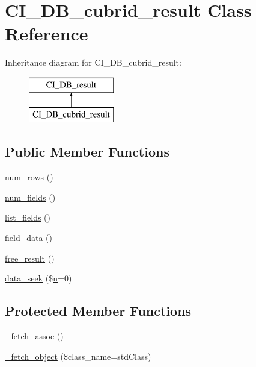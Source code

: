 \hypertarget{class_c_i___d_b__cubrid__result}{}\section{C\+I\+\_\+\+D\+B\+\_\+cubrid\+\_\+result Class Reference}
\label{class_c_i___d_b__cubrid__result}
Inheritance diagram for C\+I\+\_\+\+D\+B\+\_\+cubrid\+\_\+result\+:\begin{figure}[H]
\begin{center}
\leavevmode
\includegraphics[height=2.000000cm]{class_c_i___d_b__cubrid__result}
\end{center}
\end{figure}
\subsection*{Public Member Functions}
\begin{DoxyCompactItemize}
\item 
\mbox{\hyperlink{class_c_i___d_b__cubrid__result_a218657c303ee499b97710ab0cd2f5d6e}{num\+\_\+rows}} ()
\item 
\mbox{\hyperlink{class_c_i___d_b__cubrid__result_af831bf363e4d7d661a717a4932af449d}{num\+\_\+fields}} ()
\item 
\mbox{\hyperlink{class_c_i___d_b__cubrid__result_a50b54eb4ea7cfd039740f532988ea776}{list\+\_\+fields}} ()
\item 
\mbox{\hyperlink{class_c_i___d_b__cubrid__result_a84bffd65e53902ade1591716749a33e3}{field\+\_\+data}} ()
\item 
\mbox{\hyperlink{class_c_i___d_b__cubrid__result_aad2d98d6beb3d6095405356c6107b473}{free\+\_\+result}} ()
\item 
\mbox{\hyperlink{class_c_i___d_b__cubrid__result_a8255ae91816e4206e29eb7581c5af0f1}{data\+\_\+seek}} (\$\mbox{\hyperlink{cli_2error__php_8php_a2e6b16bbc42094e4c51ade3c10afdcf1}{n}}=0)
\end{DoxyCompactItemize}
\subsection*{Protected Member Functions}
\begin{DoxyCompactItemize}
\item 
\mbox{\hyperlink{class_c_i___d_b__cubrid__result_a43a9a92817f1334a1c10752ec44275a0}{\+\_\+fetch\+\_\+assoc}} ()
\item 
\mbox{\hyperlink{class_c_i___d_b__cubrid__result_a60806be6a9c2488820813c2a7f4fef71}{\+\_\+fetch\+\_\+object}} (\$class\+\_\+name=\textquotesingle{}std\+Class\textquotesingle{})
\end{DoxyCompactItemize}
